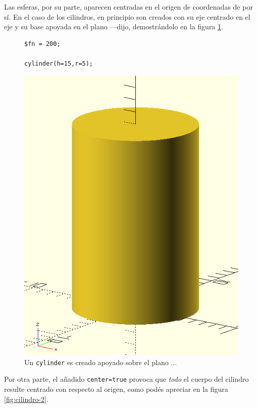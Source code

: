 \guillemotright Las esferas, por su parte, aparecen centradas en el
origen de coordenadas de por sí. En el caso de los cilindros, en
principio son creados con su eje centrado en el eje  y su
base apoyada en el plano  ---dijo, demostrándolo en la
figura \ref{fig:cilindro-1}.

\begin{figure}[ht]
  \begin{minipage}[]{.5\textwidth}
    \begin{lstlisting}
$fn = 200;
      
cylinder(h=15,r=5);
    \end{lstlisting}%
  \end{minipage}\hfill
   \begin{minipage}[]{.5\textwidth}
     \centering
     \includegraphics[width=.6\textwidth]{imagenes/cilindro-1}
   \end{minipage}
   \caption{Un \lstinline!cylinder! es creado apoyado sobre el plano
     ...}
  \label{fig:cilindro-1}
\end{figure}

\guillemotright Por otra parte, el añadido \lstinline!center=true!
provoca que \emph{todo} el cuerpo del cilindro resulte centrado con
respecto al origen, como podés apreciar en la figura
\ref{fig:cilindro-2}.

